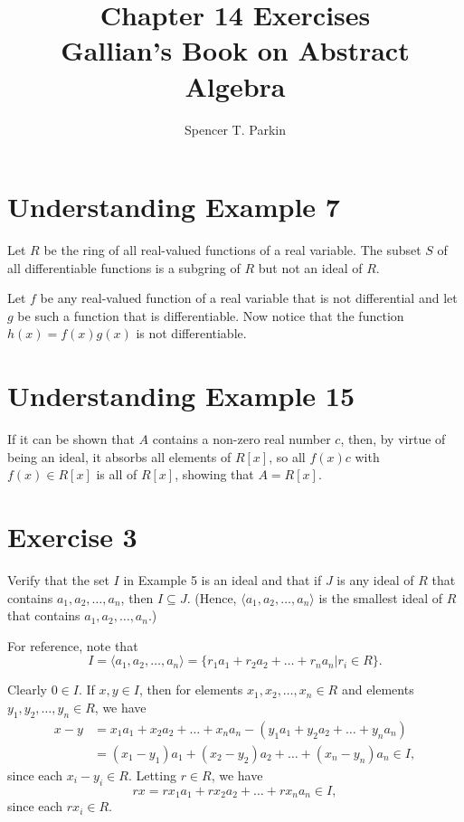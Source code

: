 \documentclass[12pt]{article}
\title{Chapter 14 Exercises\\Gallian's Book on Abstract Algebra}
\author{Spencer T. Parkin}
\begin{document}
\maketitle

\section*{Understanding Example 7}

Let $R$ be the ring of all real-valued functions of a real variable.
The subset $S$ of all differentiable functions is a subgring of $R$
but not an ideal of $R$.

Let $f$ be any real-valued function of a real variable that is not differential and let $g$
be such a function that is differentiable.  Now notice that the
function $h(x)=f(x)g(x)$ is not differentiable.

\section*{Understanding Example 15}

If it can be shown that $A$ contains a non-zero real number $c$, then,
by virtue of being an ideal, it absorbs all elements of $R[x]$,
so all $f(x)c$ with $f(x)\in R[x]$ is all of $R[x]$, showing that $A=R[x]$.

\section*{Exercise 3}

Verify that the set $I$ in Example 5 is an ideal and that if $J$ is any ideal
of $R$ that contains $a_1,a_2,\dots,a_n$, then $I\subseteq J$.
(Hence, $\langle a_1,a_2,\dots,a_n\rangle$ is the smallest ideal of $R$
that contains $a_1,a_2,\dots,a_n$.)

For reference, note that
\begin{equation*}
I=\langle a_1,a_2,\dots,a_n\rangle=\{r_1a_1+r_2a_2+\dots+r_na_n|r_i\in R\}.
\end{equation*}

Clearly $0\in I$.  If $x,y\in I$, then for elements $x_1,x_2,\dots,x_n\in R$
and elements $y_1,y_2,\dots,y_n\in R$, we have
\begin{align*}
x-y&=x_1a_1+x_2a_2+\dots+x_na_n-(y_1a_1+y_2a_2+\dots+y_na_n) \\
 &= (x_1-y_1)a_1+(x_2-y_2)a_2+\dots+(x_n-y_n)a_n \in I,
\end{align*}
since each $x_i-y_i\in R$.  Letting $r\in R$, we have
\begin{equation*}
rx = rx_1a_1+rx_2a_2+\dots+rx_na_n\in I,
\end{equation*}
since each $rx_i\in R$.
\end{document}
